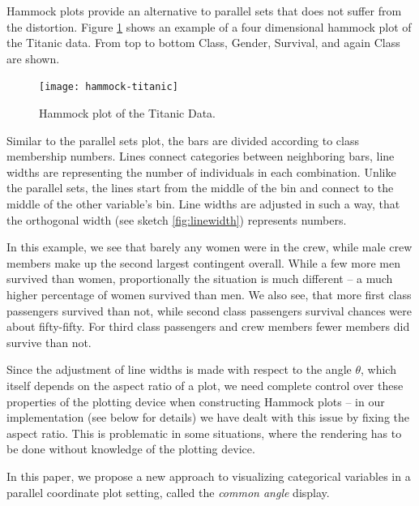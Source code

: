 Hammock plots \citep{schonlau:2003} provide an alternative to parallel sets that does not suffer from the distortion. Figure \ref{hammock} shows an example of a four dimensional hammock plot of the Titanic data. From top to bottom Class, Gender, Survival, and again Class are shown. 
\begin{figure}
\centering
\texttt{[image: hammock-titanic]}
\caption{\label{hammock} Hammock plot of the Titanic Data. }
\end{figure}

Similar to the parallel sets plot, the bars are divided according to class membership numbers.  Lines connect categories between neighboring bars, line widths are representing the number of individuals in each combination. Unlike the parallel sets, the lines start from the middle of the bin and connect to the middle of the other variable's bin. Line widths are adjusted in such a way, that the orthogonal width (see sketch \ref{fig:linewidth}) represents numbers.

In this example, we see that barely any women were in the crew, while male crew members make up the second largest contingent overall. While a few more men survived than women, proportionally the situation is much different -- a much higher percentage of women survived than men. We also see, that more first class passengers survived than not, while second class passengers survival chances were about fifty-fifty. For third class passengers and crew members fewer members did  survive than not. 

Since the adjustment of line widths is made with respect to the angle $\theta$, which itself depends on the aspect ratio of a plot, we need complete control over these properties of the plotting device when constructing Hammock plots  -- in our implementation (see below for details) we have dealt with this issue by fixing the aspect ratio. This is problematic in some situations, where the rendering has to be done without knowledge of the plotting device. 



In this paper, we propose a new approach to visualizing categorical variables in a parallel coordinate plot setting, called the {\it common angle} display. 


